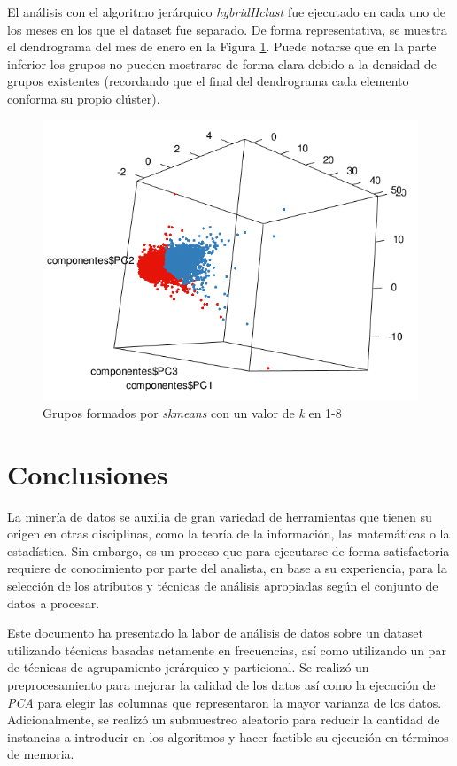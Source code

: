 \documentclass[12pt]{article}
\numberwithin{equation}{section}
\numberwithin{table}{section}
\numberwithin{figure}{section}
\begin{document}
El análisis con el algoritmo jerárquico \emph{hybridHclust} fue ejecutado en cada uno de los meses en los que el dataset fue separado.
De forma representativa, se muestra el dendrograma del mes de enero en la Figura \ref{fig:ejecucion-hybrid}.
Puede notarse que en la parte inferior los grupos no pueden mostrarse de forma clara debido a la densidad de grupos existentes (recordando que el final del dendrograma cada elemento conforma su propio clúster).
\begin{figure}
\includegraphics[width=1\textwidth]{imagenes/k2}
\caption{Grupos formados por \emph{skmeans} con un valor de \emph{k} en 1-8}
\label{fig:ejecucion-hybrid}
\end{figure}

\section{Conclusiones}
La minería de datos se auxilia de gran variedad de herramientas que tienen su origen en otras disciplinas, como la teoría de la información, las matemáticas o la estadística. Sin embargo, es un proceso que para ejecutarse de forma satisfactoria requiere de conocimiento por parte del analista, en base a su experiencia, para la selección de los atributos y técnicas de análisis apropiadas según el conjunto de datos a procesar.

Este documento ha presentado la labor de análisis de datos sobre un dataset utilizando técnicas basadas netamente en frecuencias, así como utilizando un par de técnicas de agrupamiento jerárquico y particional.
Se realizó un preprocesamiento para mejorar la calidad de los datos así como la ejecución de \emph{PCA} para elegir las columnas que representaron la mayor varianza de los datos. Adicionalmente, se realizó un submuestreo aleatorio para reducir la cantidad de instancias a introducir en los algoritmos y hacer factible su ejecución en términos de memoria.
\end{document}
